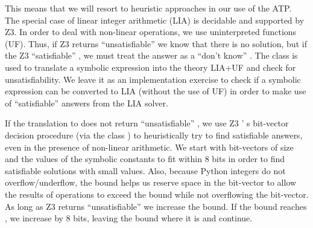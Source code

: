 \documentclass{IOS-Book-Article}
\begin{document}
\begin{mdP}[class={indent},data-line={845}]%
{}This means that we will resort to heuristic approaches in our use
of the%
{}{\mdNbsp}%
{} ATP.  The special case of linear integer arithmetic (LIA)
is decidable and supported by Z3. In order to deal with non-linear operations,
we use uninterpreted functions (UF). Thus, if Z3 returns
{}{\textquotedblleft}unsatisfiable{\textquotedblright}%
{} we know that there is no solution, but if the
Z3 %
{}{\textquotedblleft}satisfiable{\textquotedblright}%
{}, we must treat the answer as a %
{}{\textquotedblleft}don{'}t know{\textquotedblright}%
{}. 
The class %
{}%
{} is used to translate a symbolic expression
into the theory LIA+UF and check for unsatisfiability. We leave it as an
implementation exercise to check if a symbolic expression can
be converted to LIA (without the use of UF) in order to make
use of %
{}{\textquotedblleft}satisfiable{\textquotedblright}%
{} answers from the LIA solver.%
\end{mdP}%
\begin{mdP}[class={indent},data-line={857}]%
{}If the translation to %
{}%
{} does not return %
{}{\textquotedblleft}unsatisfiable{\textquotedblright}%
{}, we
use Z3%
{}{'}%
{}s bit-vector decision procedure (via the class
{}%
{}) to heuristically
try to find satisfiable answers, even in the presence of non-linear 
arithmetic. We start with bit-vectors of size %
{}%
{} and %
{}%
{} the values
of the symbolic constants to fit within 8 bits in order to find 
satisfiable solutions
with small values. Also, because Python integers do not overflow/underflow, 
the bound helps us reserve space in the bit-vector to allow the
results of operations to exceed the bound while not overflowing
the bit-vector. As long as Z3 returns %
{}{\textquotedblleft}unsatisfiable{\textquotedblright}%
{} we increase
the bound. If the bound reaches %
{}%
{}, we increase %
{}%
{} by 8 bits,
leaving the bound where it is and continue.%
\end{mdP}%
\end{document}

